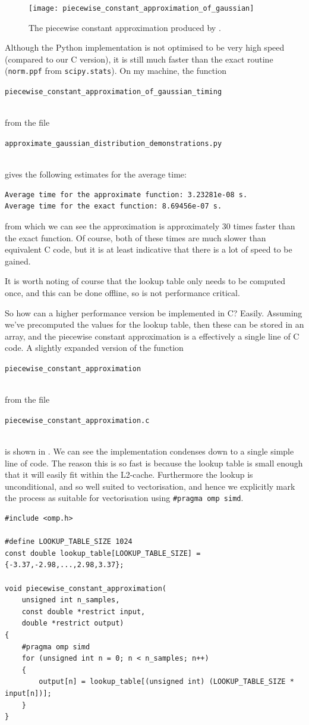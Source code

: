 \documentclass[11pt,a4paper,twoside,english]{extarticle}
\newcommand{\singlecodeline}[1]{\\[1em]\centerline{\lstinline[basicstyle=\ttfamily]$#1$}\\[1em]}
\begin{document}
\begin{figure}[htb]
\centering
\texttt{[image: piecewise\_constant\_approximation\_of\_gaussian]}
\caption{The piecewise constant approximation produced by .}
\label{fig:piecewise_constant_approximation_of_gaussian}
\end{figure}

Although the Python implementation is not optimised to be very high speed (compared to our C version), it is still much faster than the exact routine (\verb|norm.ppf| from \verb|scipy.stats|). On my machine, the function \singlecodeline{piecewise_constant_approximation_of_gaussian_timing} from the file \singlecodeline{approximate_gaussian_distribution_demonstrations.py} gives the following estimates for the average time:
\begin{verbatim}
Average time for the approximate function: 3.23281e-08 s.
Average time for the exact function: 8.69456e-07 s.
\end{verbatim}
from which we can see the approximation is approximately 30 times faster than the exact function. Of course, both of these times are much slower than equivalent C code, but it is at least indicative that there is a lot of speed to be gained. 


It is worth noting of course that the lookup table only needs to be computed once, and this can be done offline, so is not performance critical. 

So how can a higher performance version be implemented in C? Easily. Assuming we've precomputed the values for the lookup table, then these can be stored in an array, and the piecewise constant approximation is a effectively a single line of C code. A slightly expanded version of the function \singlecodeline{piecewise_constant_approximation}
from the file \singlecodeline{piecewise_constant_approximation.c}
is shown in . We can see the implementation condenses down to a single simple line of code. The reason this is so fast is because the lookup table is small enough that it will easily fit within the L2-cache. Furthermore the lookup is unconditional, and so well suited to vectorisation, and hence we explicitly mark the process as suitable for vectorisation using \verb|#pragma omp simd|.

\begin{lstfloat}[htb]
\begin{lstlisting}[style=C, captionpos=b, caption={Constructing a piecewise constant approximation.}, label={code:c:piecewise_constant_approximation}]
#include <omp.h>

#define LOOKUP_TABLE_SIZE 1024
const double lookup_table[LOOKUP_TABLE_SIZE] = {-3.37,-2.98,...,2.98,3.37};

void piecewise_constant_approximation(
    unsigned int n_samples, 
    const double *restrict input, 
    double *restrict output)
{
    #pragma omp simd
    for (unsigned int n = 0; n < n_samples; n++)
    {
        output[n] = lookup_table[(unsigned int) (LOOKUP_TABLE_SIZE * input[n])];
    }
}
\end{lstlisting}
\end{lstfloat}
\end{document}
